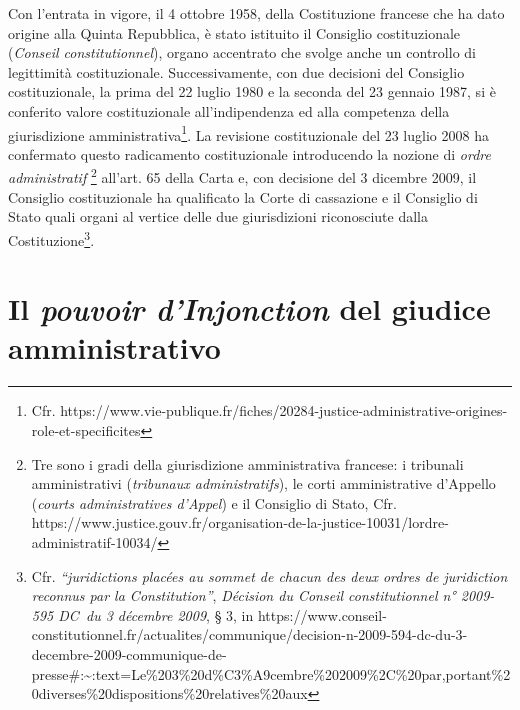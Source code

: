 \documentclass[12pt,it,a4paper,]{report}
\begin{document}
Con l'entrata in vigore, il 4 ottobre 1958, della Costituzione francese
che ha dato origine alla Quinta Repubblica, è stato istituito il
Consiglio costituzionale (\emph{Conseil constitutionnel}), organo
accentrato che svolge anche un controllo di legittimità costituzionale.
Successivamente, con due decisioni del Consiglio costituzionale, la
prima del 22 luglio 1980 e la seconda del 23 gennaio 1987, si è
conferito valore costituzionale all'indipendenza ed alla competenza
della giurisdizione amministrativa\footnote{Cfr.
  https://www.vie-publique.fr/fiches/20284-justice-administrative-origines-role-et-specificites}.
La revisione costituzionale del 23 luglio 2008 ha confermato questo
radicamento costituzionale introducendo la nozione di \emph{ordre
administratif} \footnote{Tre sono i gradi della giurisdizione
  amministrativa francese: i tribunali amministrativi (\emph{tribunaux
  administratifs}), le corti amministrative d'Appello (\emph{courts
  administratives d'Appel}) e il Consiglio di Stato, Cfr.
  https://www.justice.gouv.fr/organisation-de-la-justice-10031/lordre-administratif-10034/}
all'art. 65 della Carta e, con decisione del 3 dicembre 2009, il
Consiglio costituzionale ha qualificato la Corte di cassazione e il
Consiglio di Stato quali organi al vertice delle due giurisdizioni
riconosciute dalla Costituzione\footnote{Cfr. \emph{``juridictions
  placées au sommet de chacun des deux ordres de juridiction reconnus
  par la Constitution''}, \emph{Décision du Conseil constitutionnel n°
  2009-595 DC~du 3 décembre 2009}, § 3, in
  https://www.conseil-constitutionnel.fr/actualites/communique/decision-n-2009-594-dc-du-3-decembre-2009-communique-de-presse\#:\textasciitilde:text=Le\%203\%20d\%C3\%A9cembre\%202009\%2C\%20par,portant\%20diverses\%20dispositions\%20relatives\%20aux}.

\hypertarget{il-pouvoir-dinjonction-del-giudice-amministrativo}{%
\section{\texorpdfstring{Il \emph{pouvoir d'Injonction} del giudice
amministrativo}{Il pouvoir d'Injonction del giudice amministrativo}}\label{il-pouvoir-dinjonction-del-giudice-amministrativo}}
\end{document}

